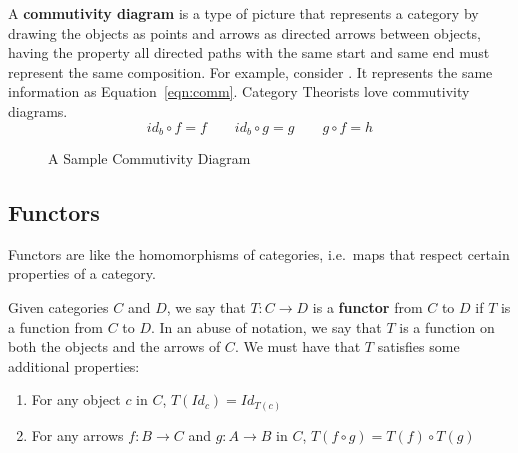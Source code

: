 \documentclass[14pt]{extarticle}  %
\begin{document}
\begin{defn}
  A \textbf{commutivity diagram} is a type of picture that represents a category by drawing the objects as points and arrows as directed arrows between objects, having the property all directed
  paths with the same start and same end must represent the same composition. For example, consider . It represents the same information as Equation~\ref{eqn:comm}.
  Category Theorists love commutivity diagrams.
  \begin{equation}\label{eqn:comm}
    id_{b} \circ f = f \qquad id_{b} \circ g = g \qquad g \circ f = h
\end{equation}



  \begin{figure}[h]
\centering
\caption{A Sample Commutivity Diagram}
\label{fig:commdia}
\end{figure}
\end{defn}


\subsection{Functors}
Functors are like the homomorphisms of categories, i.e.\ maps that respect certain properties of a category.

\begin{defn}
  Given categories $C$ and $D$, we say that $T : C \to D$ is a \textbf{functor} from $C$ to $D$ if $T$ is a function from $C$ to $D$.
  In an abuse of notation, we say that $T$ is a function on both the objects and the arrows of $C$.
  We must have that $T$ satisfies some additional properties:
  \begin{enumerate}
    \item For any object $c$ in $C$, $T(Id_{c}) = Id_{T(c)}$
          \item For any arrows $f : B \to C$ and $g : A \to B$ in $C$, $T(f \circ g) = T(f) \circ T(g)$
    \end{enumerate}
\end{defn}
\end{document}
